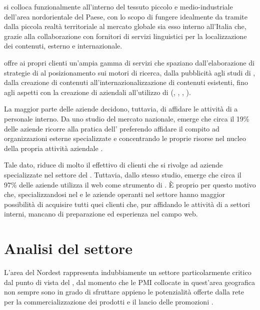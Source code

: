 \customer si colloca funzionalmente all'interno del tessuto piccolo e medio-industriale dell'area nordorientale del Paese, con lo scopo di fungere idealmente da tramite dalla piccola realtà territoriale al mercato globale sia esso interno all'Italia che, grazie alla collaborazione con fornitori di servizi linguistici per la localizzazione dei contenuti, esterno e internazionale.

\customer offre ai propri clienti un'ampia gamma di servizi che spaziano dall'elaborazione di strategie di \mktg al posizionamento sui motori di ricerca, dalla pubblicità  agli studi di , dalla creazione di contenuti all'internazionalizzazione di contenuti esistenti, fino agli aspetti  con la creazione di  aziendali all'utilizzo di  (, , , ).

La maggior parte delle aziende decidono, tuttavia, di affidare le attività di \mktg a personale interno. Da uno studio del mercato nazionale, emerge che circa il 19\% delle aziende ricorre alla pratica dell' preferendo affidare il compito ad organizzazioni esterne specializzate e concentrando le proprie risorse nel nucleo della propria attività aziendale \cite{picciaiola:indagine}.

Tale dato, riduce di molto il  effettivo di clienti che si rivolge ad aziende specializzate nel settore del \mktg.
Tuttavia, dallo stesso studio, emerge che circa il 97\% delle aziende utilizza il web come strumento di \mktg. È  proprio per questo motivo che, specializzandosi nel \mktg {} e  le aziende operanti nel settore hanno maggior possibilità di acquisire tutti quei clienti che, pur affidando le attività di \mktg a settori interni,  mancano di preparazione ed esperienza nel campo web.

\section{Analisi del settore}
L'area del Nordest rappresenta indubbiamente un settore particolarmente critico dal punto di vista del \mktg {}, dal momento che le PMI collocate in quest'area geografica non sempre sono in grado di sfruttare appieno le potenzialità offerte dalla rete per la commercializzazione dei prodotti e il lancio delle promozioni \cite[\itshape{}pag. 6 e succ.]{bassi:pmi}.

